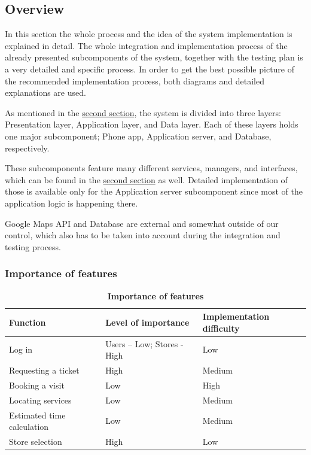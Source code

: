 \subsection{Overview}

\hspace{\parindent}In this section the whole process and the idea of the system implementation is explained in detail. The whole integration and implementation process of the already presented subcomponents of the system,  together with the testing plan is a very detailed and specific process. In order to get the best possible picture of the recommended implementation process, both diagrams and detailed explanations are used. \newline

As mentioned in the \hyperlink{section.2}{second section}, the system is divided into three layers: Presentation layer, Application layer, and Data layer. Each of these layers holds one major subcomponent; Phone app, Application server, and Database, respectively.  \newline

 

These subcomponents feature many different services, managers, and interfaces, which can be found in the \hyperlink{section.2}{second section} as well. Detailed implementation of those is available only for the Application server subcomponent since most of the application logic is happening there. \newline

 

Google Maps API and Database are external and somewhat outside of our control, which also has to be taken into account during the integration and testing process.  


\subsubsection{Importance of features}

\begin{table}[H]
\begin{flushleft}
\begin{tabular}{|l|l|l|}
\hline
\textbf{Function }& \textbf{Level of importance} & \textbf{Implementation difficulty} \\
\hline
Log in & Users – Low; Stores - High & Low \\
\hline
Requesting a ticket & High & Medium \\
\hline
Booking a visit & Low & High \\
\hline
Locating services & Low & Medium \\
\hline
Estimated time calculation & Low & Medium \\
\hline
Store selection & High & Low  \\
\hline
\end{tabular}
\end{flushleft}
\caption{\textbf{Importance of features}}
\label{tab:feat1}
\end{table}

